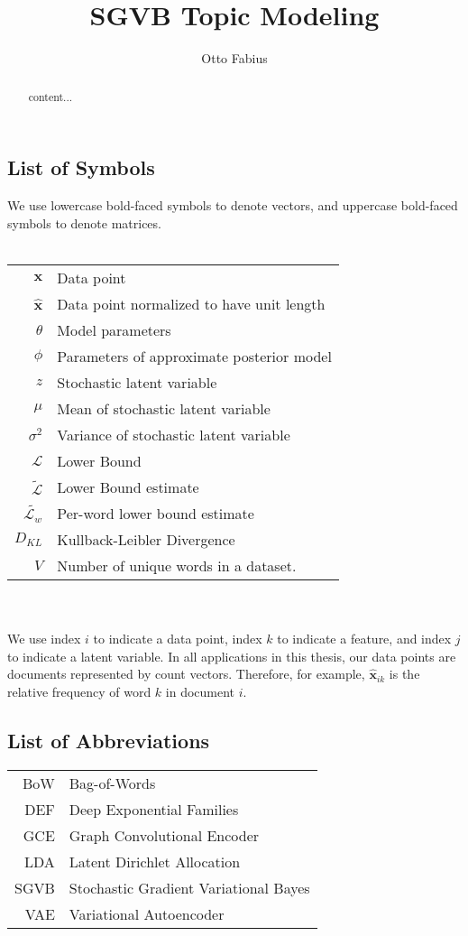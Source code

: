 \documentclass{report}
\author{Otto Fabius}
\title{SGVB Topic Modeling}
\begin{document}
\large
\doublespacing
\maketitle
\begin{abstract}
	content...
\end{abstract}
\chapter*{}
\onehalfspacing
\section*{List of Symbols}
We use lowercase bold-faced symbols to denote vectors, and uppercase bold-faced symbols to denote matrices. \\ \\
\begin{tabular}{r l}
	\hspace{15mm} $\mathbf{x}$ & Data point \\
	$\mathbf{\hat{x}}$ & Data point normalized to have unit length \\	
	$\theta$ &  Model parameters \\
	$\phi$ & Parameters of approximate posterior model \\
	$z$ & Stochastic latent variable\\
	$\mu$ & Mean of stochastic latent variable\\
	$\sigma ^2 $ & Variance of stochastic latent variable \\
	$\mathcal{L}$ & Lower Bound \\
	$\tilde{\mathcal{L}}$ & Lower Bound estimate\\
	$\tilde{\mathcal{L}_w}$ & Per-word lower bound estimate \\
	$D_{KL}$ & Kullback-Leibler Divergence \\
	$V$ & Number of unique words in a dataset.
\end{tabular}
\\ \\
 We use index $i$ to indicate a data point, index $k$ to indicate a feature, and index $j$ to indicate a latent variable. In all applications in this thesis, our data points are documents represented by count vectors. Therefore, for example, $\mathbf{\hat{x}}_{ik}$ is the relative frequency of word $k$ in document $i$.
\section*{List of Abbreviations}
\begin{tabular}{r l}
	\hspace{10mm} BoW & Bag-of-Words \\
	DEF & Deep Exponential Families \\
	GCE & Graph Convolutional Encoder \\
	LDA & Latent Dirichlet Allocation \\
	SGVB & Stochastic Gradient Variational Bayes \\
	VAE & Variational Autoencoder \\
\end{tabular}
\end{document}
